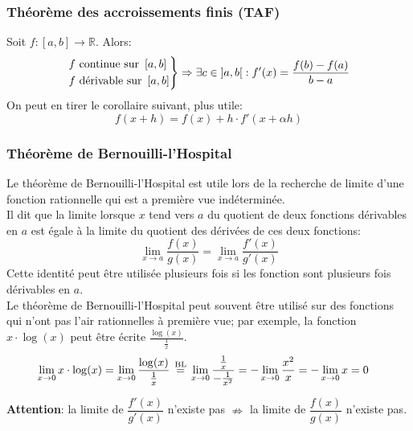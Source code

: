 \documentclass{article}
\newcommand\eqbl{\; \stackrel{\mathclap{\normalfont\text{BL}}}{ = } \;} %
\numberwithin{equation}{subsection}
\begin{document}
\subsubsection{Théorème des accroissements finis (TAF)}
Soit \(f : \left [a, b \right ] \to \mathbb{R}\). Alors:
\begin{equation*}
	\begin{rcases}
		f \text{ continue sur } \left [a, b \right ] \\
		f \text{ dérivable sur } \left [a, b \right ] 
	\end{rcases}
	\Rightarrow \exists c \in \left ]a, b \right [ : f'(x) = \frac{f(b) - f(a)}{b - a}
\end{equation*}
On peut en tirer le corollaire suivant, plus utile:
\begin{equation*}
	f(x + h) = f(x) + h \cdot f'(x + \alpha h)
\end{equation*}

\subsubsection{Théorème de Bernouilli-l'Hospital}
Le théorème de Bernouilli-l'Hospital est utile lors de la recherche de limite d'une fonction rationnelle qui est a première vue indéterminée. \\

Il dit que la limite lorsque \(x\) tend vers \(a\) du quotient de deux fonctions dérivables en \(a\) est égale à la limite du quotient des dérivées de ces deux fonctions:
\begin{equation*}
	\lim_{x \to a} \dfrac{f(x)}{g(x)} = \lim_{x \to a} \dfrac{f'(x)}{g'(x)}
\end{equation*}
Cette identité peut être utilisée plusieurs fois si les fonction sont plusieurs fois dérivables en \(a\). \\

Le théorème de Bernouilli-l'Hospital peut souvent être utilisé sur des fonctions qui n'ont pas l'air rationnelles à première vue; par exemple, la fonction \(x \cdot \log(x)\) peut être écrite \(\frac{\log(x)}{\frac{1}{x}}\).
\begin{align*}
	\lim_{x \to 0} x \cdot \log(x) &= \lim_{x \to 0} \frac{\log(x)}{\frac{1}{x}} 
	\eqbl \lim_{x \to 0} \frac{\frac{1}{x}}{- \frac{1}{x^2}} 
	= - \lim_{x \to 0} \frac{x^2}{x} 
	= - \lim_{x \to 0} x = 0
\end{align*}

\textbf{Attention}: la limite de \(\dfrac{f'(x)}{g'(x)}\) n'existe pas \(\nRightarrow\) la limite de \(\dfrac{f(x)}{g(x)}\) n'existe pas.
\end{document}
